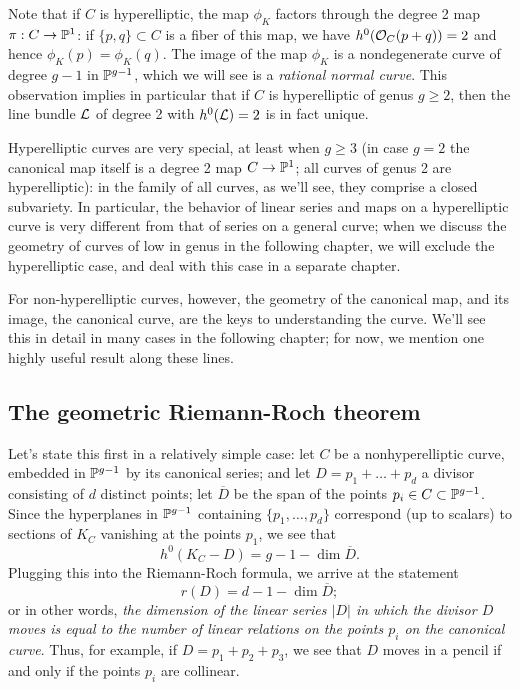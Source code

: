 \documentclass[12pt, leqno]{book}
\def\cL{{\cal L}}
\begin{document}
Note that if $C$ is hyperelliptic, the map $\phi_K$ factors through the degree 2 map $\pi : C \to \PP^1$: if $\{p,q\} \subset C$ is a fiber of this map, we have $h^0(\cO_C(p+q)) = 2$ and hence $\phi_K(p) = \phi_K(q)$. The image of the map $\phi_K$ is a nondegenerate curve of degree $g-1$ in $\PP^{g-1}$, which we will see is a \emph{rational normal curve}. This observation implies in particular that if $C$ is hyperelliptic of genus $g \geq 2$, then the line bundle $\cL$ of degree 2 with $h^0(\cL) = 2$ is in fact unique.

Hyperelliptic curves are very special, at least when $g \geq 3$ (in case $g=2$ the canonical map itself is a degree 2 map $C \to \PP^1$; all curves of genus 2 are hyperelliptic): in the family of all curves, as we'll see, they comprise a closed subvariety. In particular, the behavior of linear series and maps on a hyperelliptic curve is very different from that of series on a general curve; when we discuss the geometry of curves of low in genus in the following chapter, we will exclude  the hyperelliptic case, and deal with this case in a separate chapter.

For non-hyperelliptic curves, however, the geometry of the canonical map, and its image, the canonical curve, are the keys to understanding the curve. We'll see this in detail in many cases in the following chapter; for now, we mention one highly useful result along these lines.

\subsection{The geometric Riemann-Roch theorem}

Let's state this first in a relatively simple case: let $C$ be a nonhyperelliptic curve, embedded in $\PP^{g-1}$ by its canonical series; and let $D = p_1+\dots + p_d$ a divisor consisting of $d$ distinct points; let $\overline D$ be the span of the points $p_i \in C \subset \PP^{g-1}$. Since the hyperplanes in $\PP^{g-1}$ containing $\{p_1,\dots,p_d\}$ correspond (up to scalars) to sections of $K_C$ vanishing at the points $p_1$, we see that
$$
h^0(K_C-D) = g - 1 - \dim \overline D.
$$
Plugging this into the Riemann-Roch formula, we arrive at the statement
$$
r(D) = d - 1 - \dim \overline D;
$$
or in other words, \emph{the dimension of the linear series $|D|$ in which the divisor $D$ moves is equal to the number of linear relations on the points $p_i$ on the canonical curve}. Thus, for example, if $D = p_1+p_2+p_3$, we see that $D$ moves in a pencil if and only if the points $p_i$ are collinear.
\end{document}
